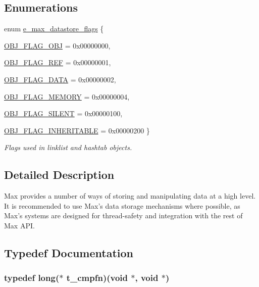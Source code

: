 \subsection*{Enumerations}
\begin{DoxyCompactItemize}
\item 
enum \hyperlink{group__datastore_gaa858d4b3815076d79624c39d9ca59348}{e\_\-max\_\-datastore\_\-flags} \{ \par
\hyperlink{group__datastore_ggaa858d4b3815076d79624c39d9ca59348adc630c58c8e958a404553a08db6fd180}{OBJ\_\-FLAG\_\-OBJ} =  0x00000000, 
\par
\hyperlink{group__datastore_ggaa858d4b3815076d79624c39d9ca59348aee2810996bf0475ddcb07b039b162d52}{OBJ\_\-FLAG\_\-REF} =  0x00000001, 
\par
\hyperlink{group__datastore_ggaa858d4b3815076d79624c39d9ca59348a862748073762ebc9f5899a8c1d63053a}{OBJ\_\-FLAG\_\-DATA} =  0x00000002, 
\par
\hyperlink{group__datastore_ggaa858d4b3815076d79624c39d9ca59348a03c245bc502773743d2ff575208a8b67}{OBJ\_\-FLAG\_\-MEMORY} =  0x00000004, 
\par
\hyperlink{group__datastore_ggaa858d4b3815076d79624c39d9ca59348a7551721629504fee7ecf5973e467de80}{OBJ\_\-FLAG\_\-SILENT} =  0x00000100, 
\par
\hyperlink{group__datastore_ggaa858d4b3815076d79624c39d9ca59348a20be48992fc9be2b12940730c09d704c}{OBJ\_\-FLAG\_\-INHERITABLE} =  0x00000200
 \}
\begin{DoxyCompactList}\small\item\em Flags used in linklist and hashtab objects. \item\end{DoxyCompactList}\end{DoxyCompactItemize}


\subsection{Detailed Description}
Max provides a number of ways of storing and manipulating data at a high level. It is recommended to use Max's data storage mechanisms where possible, as Max's systems are designed for thread-\/safety and integration with the rest of Max API. 

\subsection{Typedef Documentation}
\hypertarget{group__datastore_gaaf4ae6dd800a2be9abd645cf70aeb38f}{
\subsubsection[{t\_\-cmpfn}]{\setlength{\rightskip}{0pt plus 5cm}typedef long($\ast$ {\bf t\_\-cmpfn})(void $\ast$, void $\ast$)}}
\label{group__datastore_gaaf4ae6dd800a2be9abd645cf70aeb38f}


